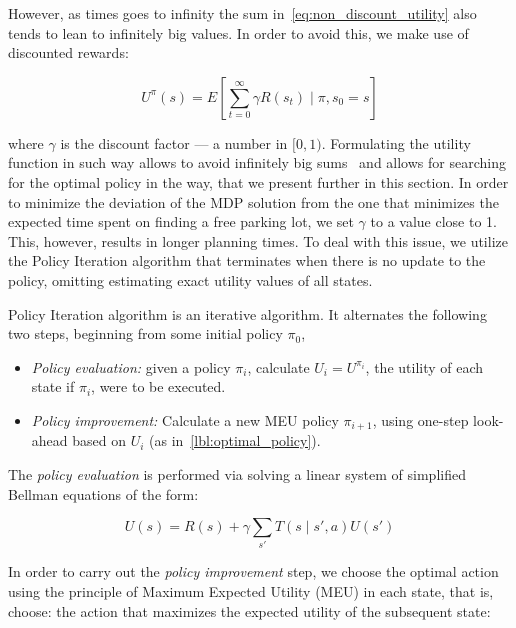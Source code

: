 However, as times goes to infinity the sum in~\eqref{eq:non_discount_utility}
also tends to lean to infinitely big values. In order to avoid this, we make
use of discounted rewards:

\begin{equation}
\label{eq:discount_utility}
U^{\pi}(s) = E\left[\sum_{t=0}^{\infty} \gamma R(s_t) \mid \pi,s_0 = s \right]
\end{equation}

where $\gamma$ is the discount factor --- a number in $[0, 1)$. Formulating
the utility function in such way allows to avoid infinitely big
sums~\cite{Russell:2003:AIM:773294} and allows for searching for the optimal
policy in the way, that we present further in this section. In order to
minimize the deviation of the MDP solution from the one that minimizes the
expected time spent on finding a free parking lot, we set $\gamma$ to a value
close to 1. This, however, results in longer planning times. To deal with this
issue, we utilize the Policy Iteration algorithm that terminates when there is
no update to the policy, omitting estimating exact utility values of all
states.

Policy Iteration algorithm is an iterative algorithm. It alternates the
following two steps, beginning from some initial policy $\pi_0$,

\begin{itemize}
    \item \emph{Policy evaluation:} given a policy $\pi_i$,
    calculate $U_i = U^{\pi_i}$, the utility of each state if $\pi_i$, were to be
    executed.
    \item \emph{Policy improvement:} Calculate a new MEU policy $\pi_{i+1}$, using one-step look-ahead based on
    $U_i$ (as in~\eqref{lbl:optimal_policy}).
\end{itemize}

The \emph{policy evaluation} is performed via solving a linear system of simplified Bellman equations of the form:

\begin{equation}
\label{lbl:bellman_equation}
U(s) = R(s) + \gamma \sum_{s'}T(s \mid s', a)U(s')
\end{equation}

In order to carry out the \emph{policy improvement} step, we choose the
optimal action using the principle of Maximum Expected Utility (MEU) in each
state, that is, choose: the action that maximizes the expected utility of the
subsequent state:

